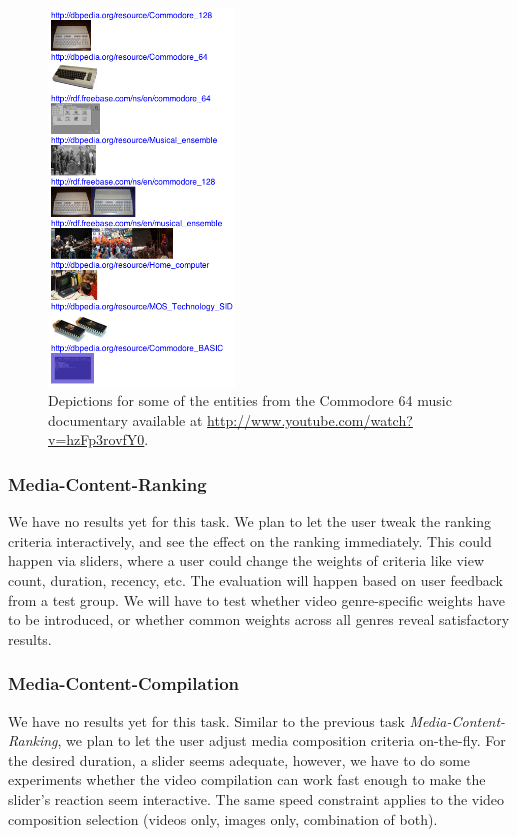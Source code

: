 \documentclass[12pt]{article}
\begin{document}
\begin{figure}[htbp!]
\begin{center}
    \includegraphics[width=0.44\textwidth]{./resources/semwebvid-entities.png}
    \caption[Depictions for some of the entities from the Commodore 64 music documentary .]{Depictions for some of the entities from the Commodore 64 music documentary available at \url{http://www.youtube.com/watch?v=hzFp3rovfY0}.}   
  \label{fig:c64}
  \end{center}  
\end{figure}

\subsubsection{Media-Content-Ranking}
We have no results yet for this task. We plan to let the user tweak the ranking criteria interactively, and see the effect on the ranking immediately. This could happen via sliders, where a user could change the weights of criteria like view count, duration, recency, etc. The evaluation will happen based on user feedback from a test group. We will have to test whether video genre-specific weights have to be introduced, or whether common weights across all genres reveal satisfactory results.

\subsubsection{Media-Content-Compilation}
We have no results yet for this task. Similar to the previous task \emph{Media-Content-Ranking}, we plan to let the user adjust media composition criteria on-the-fly. For the desired duration, a slider seems adequate, however, we have to do some experiments whether the video compilation can work fast enough to make the slider's reaction seem interactive. The same speed constraint applies to the video composition selection (videos only, images only, combination of both).
\end{document}
